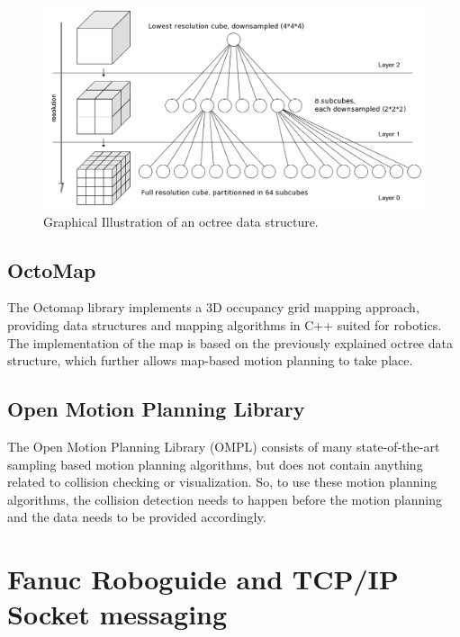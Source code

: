 \begin{figure}[!ht]
	\centering
	\includegraphics[width=0.6\linewidth]{images/Octree.png}
	\caption{Graphical Illustration of an octree data structure. \cite{fig:octree}}
	\label{fig:octree}
\end{figure}

\subsection{OctoMap \cite{hornung13auro}}
The Octomap library implements a 3D occupancy grid mapping approach, providing data structures and mapping algorithms in C++ suited for robotics. The implementation of the map is based on the previously explained octree data structure, which further allows map-based motion planning to take place.

\subsection{Open Motion Planning Library \cite{sucan2012the-open-motion-planning-library}}
The Open Motion Planning Library (OMPL) consists of many state-of-the-art sampling based motion planning algorithms, but does not contain anything related to collision checking or visualization. So, to use these motion planning algorithms, the collision detection needs to happen before the motion planning and the data needs to be provided accordingly. 

\section{Fanuc Roboguide and TCP/IP Socket messaging}
\label{chap:tcpip}
